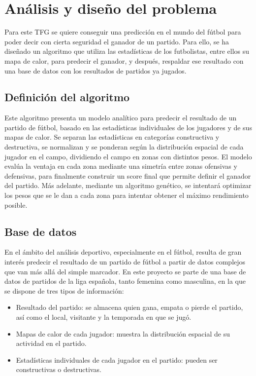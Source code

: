 \chapter{Análisis y diseño del problema}
 
Para este TFG se quiere conseguir una predicción en el mundo del fútbol para poder decir con cierta seguridad el ganador de un partido. Para ello, se ha diseñado un algoritmo que utiliza las estadísticas de los futbolistas, entre ellos su mapa de calor, para predecir el ganador, y después, respaldar ese resultado con una base de datos con los resultados de partidos ya jugados.

\section*{Definición del algoritmo}
Este algoritmo presenta un modelo analítico para predecir el resultado de un partido de fútbol, basado en las estadísticas individuales de los jugadores y de sus mapas de calor. Se separan las estadísticas en categorías constructiva y destructiva, se normalizan y se ponderan según la distribución espacial de cada jugador en el campo, dividiendo el campo en zonas con distintos pesos. El modelo evalúa la ventaja en cada zona mediante una simetría entre zonas ofensivas y defensivas, para finalmente construir un score final que permite definir el ganador del partido. Más adelante, mediante un algoritmo genético, se intentará optimizar los pesos que se le dan a cada zona para intentar obtener el máximo rendimiento posible.

\section{Base de datos}
En el ámbito del análisis deportivo, especialmente en el fútbol, resulta de gran interés predecir el resultado de un partido de fútbol a partir de datos complejos que van más allá del simple marcador. En este proyecto se parte de una base de datos de partidos de la liga española, tanto femenina como masculina, en la que se dispone de tres tipos de información:

\begin{itemize}
    \item Resultado del partido: se almacena quien gana, empata o pierde el partido, así como el local, visitante y la temporada en que se jugó.
    \item Mapas de calor de cada jugador: muestra la distribución espacial de su actividad en el partido.
    \item Estadísticas individuales de cada jugador en el partido: pueden ser constructivas o destructivas.
    
\end{itemize}

